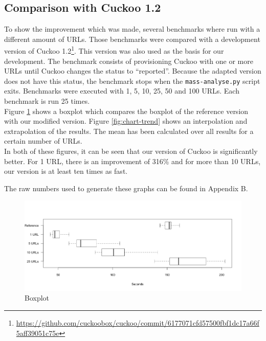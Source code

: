 \pagebreak

\restoregeometry
{}
\setcounter{page}{\thesavepage}

\subsection{Comparison with Cuckoo 1.2}

To show the improvement which was made, several benchmarks where run with a different amount of URLs. Those benchmarks were compared with a development version of Cuckoo 1.2\footnote{\url{https://github.com/cuckoobox/cuckoo/commit/6177071cfd57500fbf1dc17a66f5aff39051c75e}}. This version was also used as the basis for our development. The benchmark consists of provisioning Cuckoo with one or more URLs until Cuckoo changes the status to ``reported''. Because the adapted version does not have this status, the benchmark stops when the \texttt{mass-analyse.py} script exits. Benchmarks were executed with 1, 5, 10, 25, 50 and 100 URLs. Each benchmark is run 25 times.\\

Figure \ref{fig:chart-box} shows a boxplot which compares the boxplot of the reference version with our modified version. Figure \ref{fig:chart-trend} shows an interpolation and extrapolation of the results. The mean has been calculated over all results for a certain number of URLs.\\

In both of these figures, it can be seen that our version of Cuckoo is significantly better. For 1 URL, there is an improvement of 316\% and for more than 10 URLs, our version is at least ten times as fast.

The raw numbers used to generate these graphs can be found in Appendix B.\\

\begin{figure}[h]
    \centering
    \centerline{\includegraphics[width=20cm]{Images/chart-box.png}}
    \caption{Boxplot}
    \label{fig:chart-box}
\end{figure}

